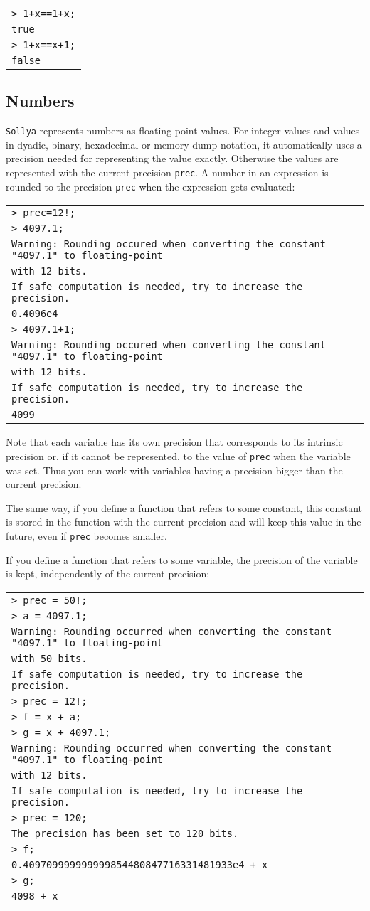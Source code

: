\documentclass[a4paper]{article}
\newcommand{\com}[1]{\texttt{#1}}
\newcommand{\sollya}{\texttt{Sollya}\xspace}
\newcommand{\code}[1]{
\begin{center}
\begin{tabular}{|p{14.8cm}|}
\hline
#1
\hline
\end{tabular}
\end{center}
}
\newcommand{\ligne}[1]{\texttt{#1}\\}
\begin{document}
\code{
\ligne{> 1+x==1+x;}
\ligne{true}
\ligne{> 1+x==x+1;}
\ligne{false}
}

\subsection{Numbers}
\sollya represents numbers as floating-point values. For integer values and values in dyadic, binary, hexadecimal or memory dump notation, it 
automatically uses a precision needed for representing the value exactly. Otherwise the values are represented with the current precision \com{prec}. A number in an expression is rounded to the precision \com{prec} when the expression gets evaluated:

\code{
\ligne{> prec=12!;}
\ligne{> 4097.1;}
\ligne{Warning: Rounding occured when converting the constant "4097.1" to floating-point}
\ligne{with 12 bits.}
\ligne{If safe computation is needed, try to increase the precision.}
\ligne{0.4096e4}
\ligne{> 4097.1+1;}
\ligne{Warning: Rounding occured when converting the constant "4097.1" to floating-point}
\ligne{with 12 bits.}
\ligne{If safe computation is needed, try to increase the precision.}
\ligne{4099}
}

Note that each variable has its own precision that corresponds to its intrinsic precision or, if it cannot be represented, to the value of \com{prec} when the variable was set. Thus you can work with variables having a precision bigger than the current precision.

The same way, if you define a function that refers to some constant, this constant is stored in the function with the current precision and will keep this value in the future, even if \com{prec} becomes smaller.

If you define a function that refers to some variable, the precision of the variable is kept, independently of the current precision:

\code{
\ligne{> prec = 50!;}
\ligne{> a = 4097.1;}
\ligne{Warning: Rounding occurred when converting the constant "4097.1" to floating-point}
\ligne{with 50 bits.}
\ligne{If safe computation is needed, try to increase the precision.}
\ligne{> prec = 12!;}
\ligne{> f = x + a;}
\ligne{> g = x + 4097.1;}
\ligne{Warning: Rounding occurred when converting the constant "4097.1" to floating-point} 
\ligne{with 12 bits.}
\ligne{If safe computation is needed, try to increase the precision.}
\ligne{> prec = 120;}
\ligne{The precision has been set to 120 bits.}
\ligne{> f;}
\ligne{0.409709999999999854480847716331481933e4 + x}
\ligne{> g;}
\ligne{4098 + x}
}
\end{document}
